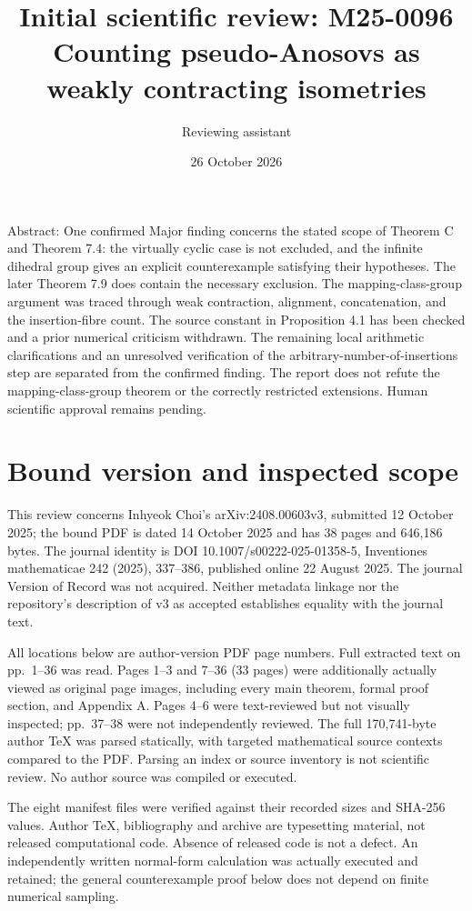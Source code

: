 \documentclass[10pt]{article}
\title{Initial scientific review: M25-0096
Counting pseudo-Anosovs as weakly contracting isometries}
\author{Reviewing assistant}
\date{26 October 2026}
\begin{document}
\maketitle
Abstract: One confirmed Major finding concerns the stated scope of Theorem C and Theorem 7.4: the virtually cyclic case is not excluded, and the infinite dihedral group gives an explicit counterexample satisfying their hypotheses. The later Theorem 7.9 does contain the necessary exclusion. The mapping-class-group argument was traced through weak contraction, alignment, concatenation, and the insertion-fibre count. The source constant in Proposition 4.1 has been checked and a prior numerical criticism withdrawn. The remaining local arithmetic clarifications and an unresolved verification of the arbitrary-number-of-insertions step are separated from the confirmed finding. The report does not refute the mapping-class-group theorem or the correctly restricted extensions. Human scientific approval remains pending.\par
\section*{Bound version and inspected scope}
This review concerns Inhyeok Choi’s arXiv:2408.00603v3, submitted 12 October 2025; the bound PDF is dated 14 October 2025 and has 38 pages and 646,186 bytes. The journal identity is DOI 10.1007/s00222-025-01358-5, Inventiones mathematicae 242 (2025), 337–386, published online 22 August 2025. The journal Version of Record was not acquired. Neither metadata linkage nor the repository’s description of v3 as accepted establishes equality with the journal text.\par
All locations below are author-version PDF page numbers. Full extracted text on pp. 1–36 was read. Pages 1–3 and 7–36 (33 pages) were additionally actually viewed as original page images, including every main theorem, formal proof section, and Appendix A. Pages 4–6 were text-reviewed but not visually inspected; pp. 37–38 were not independently reviewed. The full 170,741-byte author TeX was parsed statically, with targeted mathematical source contexts compared to the PDF. Parsing an index or source inventory is not scientific review. No author source was compiled or executed.\par
The eight manifest files were verified against their recorded sizes and SHA-256 values. Author TeX, bibliography and archive are typesetting material, not released computational code. Absence of released code is not a defect. An independently written normal-form calculation was actually executed and retained; the general counterexample proof below does not depend on finite numerical sampling.\par
\end{document}
